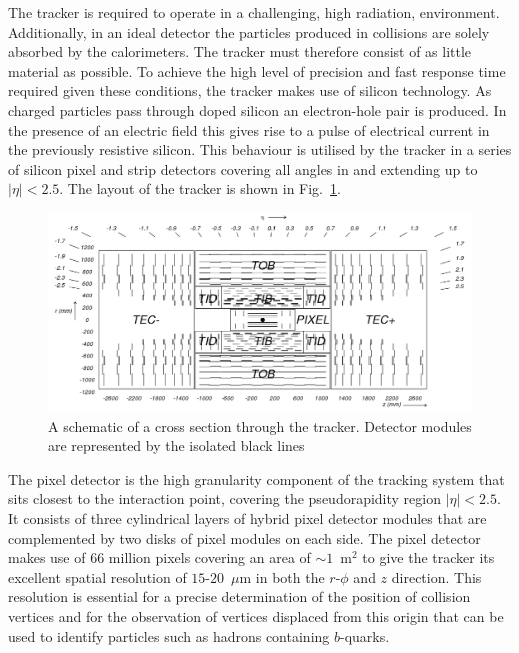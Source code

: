 The tracker is required to operate in a challenging, high radiation,
environment. Additionally, in an ideal detector the particles produced
in collisions are solely absorbed by the calorimeters. The tracker
must therefore consist of as little material as possible. To achieve
the high level of precision and fast response time required given
these conditions, the tracker makes use of silicon technology. As charged
particles pass through doped silicon an electron-hole pair is
produced. In the presence of an electric field this gives rise to a
pulse of electrical current in the previously resistive silicon. This
behaviour is utilised by the tracker in a series of silicon pixel and
strip detectors covering all angles in \phi and extending up to
$|\eta|<2.5$. The layout of the tracker is shown in
Fig.~\ref{fig:tracker}. 

\begin{figure}
\begin{center}
\includegraphics[width=0.8\linewidth]{figs/cmstracker} \end{center}
\caption{ A schematic of a cross section through the \CMS tracker.
Detector modules are represented by the isolated black lines \cite{Chatrchyan:2008aa}}
\label{fig:tracker} \end{figure}

The pixel detector is the high granularity component of the tracking
system that sits closest to the interaction point, covering the
pseudorapidity region $|\eta|<2.5$. It consists of three cylindrical
layers of hybrid pixel detector modules that are complemented by two
disks of pixel modules on each side. The pixel detector makes use of
66 million pixels covering an area of $\sim 1$~m$^2$ to give the
tracker its excellent spatial resolution of $15$-$20$~$\mu$m in both
the $r$-$\phi$ and $z$ direction. This resolution is essential for a
precise determination of the position of collision vertices and
for the observation of vertices displaced from this origin that can be
used to identify particles such as hadrons containing $b$-quarks.

